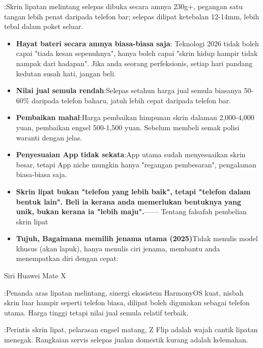 
:Skrin lipatan melintang selepas dibuka secara amnya 230g+, pegangan satu tangan lebih penat daripada telefon bar; selepas dilipat ketebalan 12-14mm, lebih tebal dalam poket seluar.

\begin{itemize}
  \item \textbf{Hayat bateri secara amnya biasa-biasa saja}: Teknologi 2026 tidak boleh capai "tiada kesan sepenuhnya", hanya boleh capai "skrin hidup hampir tidak nampak dari hadapan". Jika anda seorang perfeksionis, setiap hari pandang kedutan susah hati, jangan beli.
  \item \textbf{Nilai jual semula rendah}:Selepas setahun harga jual semula biasanya 50-60\% daripada telefon baharu, jatuh lebih cepat daripada telefon bar.
  \item \textbf{Pembaikan mahal}:Harga pembaikan himpunan skrin dalaman 2,000-4,000 yuan, pembaikan engsel 500-1,500 yuan. Sebelum membeli semak polisi waranti dengan jelas.
  \item \textbf{Penyesuaian App tidak sekata}:App utama sudah menyesuaikan skrin besar, tetapi App niche mungkin hanya "regangan pembesaran", pengalaman biasa-biasa saja.
  \item \textbf{Skrin lipat bukan "telefon yang lebih baik", tetapi "telefon dalam bentuk lain". Beli ia kerana anda memerlukan bentuknya yang unik, bukan kerana ia "lebih maju".}—— Tentang falsafah pembelian skrin lipat
  \item \textbf{Tujuh, Bagaimana memilih jenama utama (2025)}Tidak menulis model khusus (akan lapuk), hanya menulis ciri jenama, membantu anda menempatkan diri dengan cepat:
\end{itemize}

Siri Huawei Mate X

:Penanda aras lipatan melintang, sinergi ekosistem HarmonyOS kuat, nisbah skrin luar hampir seperti telefon biasa, dilipat boleh digunakan sebagai telefon utama. Harga tinggi tetapi nilai jual semula relatif terbaik.


:Perintis skrin lipat, pelarasan engsel matang, Z Flip adalah wajah cantik lipatan menegak. Rangkaian servis selepas jualan domestik kurang adalah kelemahan.

